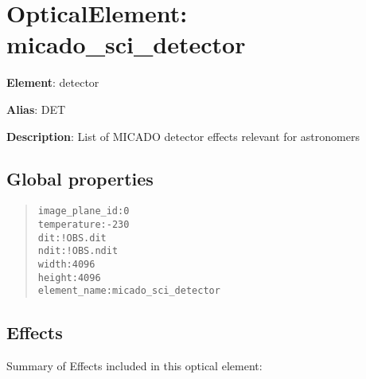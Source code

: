 

\section{OpticalElement: \textquotedbl{}micado\_sci\_detector\textquotedbl{}%
  \label{opticalelement-micado-sci-detector}%
}

\textbf{Element}: detector

\textbf{Alias}: DET

\textbf{Description}: List of MICADO detector effects relevant for astronomers


\subsection{Global properties%
  \label{global-properties}%
}

\begin{quote}
\begin{alltt}
image_plane_id : 0
   temperature : -230
           dit : !OBS.dit
          ndit : !OBS.ndit
         width : 4096
        height : 4096
  element_name : micado_sci_detector
\end{alltt}
\end{quote}


\subsection{Effects%
  \label{effects}%
}

Summary of Effects included in this optical element:

